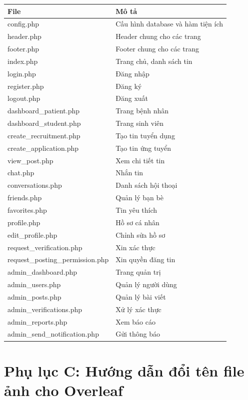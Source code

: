 \documentclass[a4paper,12pt]{report}
\begin{document}
\begin{table}[H]
\centering
\begin{tabular}{|l|l|}
\hline
\textbf{File} & \textbf{Mô tả} \\
\hline
config.php & Cấu hình database và hàm tiện ích \\
header.php & Header chung cho các trang \\
footer.php & Footer chung cho các trang \\
index.php & Trang chủ, danh sách tin \\
login.php & Đăng nhập \\
register.php & Đăng ký \\
logout.php & Đăng xuất \\
dashboard\_patient.php & Trang bệnh nhân \\
dashboard\_student.php & Trang sinh viên \\
create\_recruitment.php & Tạo tin tuyển dụng \\
create\_application.php & Tạo tin ứng tuyển \\
view\_post.php & Xem chi tiết tin \\
chat.php & Nhắn tin \\
conversations.php & Danh sách hội thoại \\
friends.php & Quản lý bạn bè \\
favorites.php & Tin yêu thích \\
profile.php & Hồ sơ cá nhân \\
edit\_profile.php & Chỉnh sửa hồ sơ \\
request\_verification.php & Xin xác thực \\
request\_posting\_permission.php & Xin quyền đăng tin \\
admin\_dashboard.php & Trang quản trị \\
admin\_users.php & Quản lý người dùng \\
admin\_posts.php & Quản lý bài viết \\
admin\_verifications.php & Xử lý xác thực \\
admin\_reports.php & Xem báo cáo \\
admin\_send\_notification.php & Gửi thông báo \\
\hline
\end{tabular}
\end{table}

\section*{Phụ lục C: Hướng dẫn đổi tên file ảnh cho Overleaf}
\end{document}
